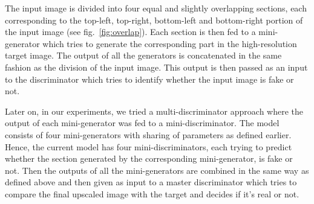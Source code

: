 \documentclass[12pt,a4paper]{article}
\begin{document}
\begin{multicols}{2}
            The input image is divided into four equal and slightly overlapping sections, each corresponding to the top-left, top-right, bottom-left and bottom-right portion of the input image (see fig.~\ref{fig:overlap}).
            Each section is then fed to a mini-generator which tries to generate the corresponding part in the high-resolution target image.
            The output of all the generators is concatenated in the same fashion as the division of the input image.
            This output is then passed as an input to the discriminator which tries to identify whether the input image is fake or not.

            Later on, in our experiments, we tried a multi-discriminator approach where the output of each mini-generator was fed to a mini-discriminator.
            The model consists of four mini-generators with sharing of parameters as defined earlier.
            Hence, the current model has four mini-discriminators, each trying to predict whether the section generated by the corresponding mini-generator, is fake or not.
            Then the outputs of all the mini-generators are combined in the same way as defined above and then given as input to a master discriminator which tries to compare the final upscaled image with the target and decides if it's real or not.


\end{multicols}
\end{document}
